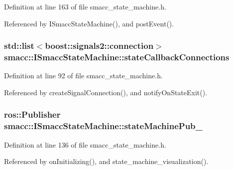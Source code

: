 Definition at line 163 of file smacc\+\_\+state\+\_\+machine.\+h.



Referenced by I\+Smacc\+State\+Machine(), and post\+Event().

\subsubsection[{\texorpdfstring{state\+Callback\+Connections}{stateCallbackConnections}}]{\setlength{\rightskip}{0pt plus 5cm}std\+::list$<$boost\+::signals2\+::connection$>$ smacc\+::\+I\+Smacc\+State\+Machine\+::state\+Callback\+Connections}\hypertarget{classsmacc_1_1ISmaccStateMachine_aaf98bb0edaa5d8c84767e4acfad3548d}{}\label{classsmacc_1_1ISmaccStateMachine_aaf98bb0edaa5d8c84767e4acfad3548d}


Definition at line 92 of file smacc\+\_\+state\+\_\+machine.\+h.



Referenced by create\+Signal\+Connection(), and notify\+On\+State\+Exit().

\subsubsection[{\texorpdfstring{state\+Machine\+Pub\+\_\+}{stateMachinePub_}}]{\setlength{\rightskip}{0pt plus 5cm}ros\+::\+Publisher smacc\+::\+I\+Smacc\+State\+Machine\+::state\+Machine\+Pub\+\_\+\hspace{0.3cm}{\ttfamily [protected]}}\hypertarget{classsmacc_1_1ISmaccStateMachine_af4aa9fed70bd4c57b19e3370fbd25de7}{}\label{classsmacc_1_1ISmaccStateMachine_af4aa9fed70bd4c57b19e3370fbd25de7}


Definition at line 136 of file smacc\+\_\+state\+\_\+machine.\+h.



Referenced by on\+Initializing(), and state\+\_\+machine\+\_\+visualization().

